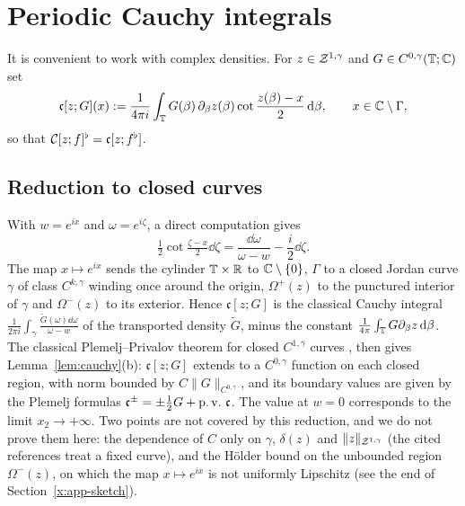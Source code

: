 \section{Periodic Cauchy integrals}\label{app:cauchy}

It is convenient to work with complex densities. For $z\in\mathcal{Z}^{1,\gamma}$ and $G\in C^{0,\gamma}(\mathbb{T};\mathbb{C})$ set
\[
\mathfrak c[z;G](x):=\frac1{4\pi i}\int_{\mathbb{T}} G(\beta)\,\partial_\beta z(\beta)\cot\frac{z(\beta)-x}{2}\,\mathrm{d}\beta,\qquad x\in\mathbb{C}\setminus\Gamma,
\]
so that $\mathcal{C}[z;f]^\flat=\mathfrak c[z;f^\flat]$.

\subsection{Reduction to closed curves}\label{x:app-reduction}
With $w=e^{ix}$ and $\omega=e^{i\zeta}$, a direct computation gives
\[
\tfrac12\cot\tfrac{\zeta-x}{2}\dd\zeta=\frac{\dd\omega}{\omega-w}-\frac i2\dd\zeta .
\]
The map $x\mapsto e^{ix}$ sends the cylinder $\mathbb{T}\times\mathbb{R}$ to $\mathbb{C}\setminus\{0\}$, $\Gamma$ to a closed Jordan curve $\gamma$ of class $C^{k,\gamma}$ winding once around the origin, $\Omega^+(z)$ to the
punctured interior of $\gamma$ and $\Omega^-(z)$ to its exterior. Hence $\mathfrak c[z;G]$ is the classical Cauchy integral $\frac1{2\pi i}\int_\gamma\frac{\tilde G(\omega)\dd\omega}{\omega-w}$ of the
transported density $\tilde G$, minus the constant $\frac1{4\pi}\int_{\mathbb{T}} G\partial_\beta z\,\mathrm{d}\beta$. The classical Plemelj--Privalov theorem for closed $C^{1,\gamma}$ curves
\cite[Chapter~2]{Mus53}, \cite[Chapter~7]{Kre14} then gives Lemma~\ref{lem:cauchy}(b): $\mathfrak c[z;G]$ extends to a $C^{0,\gamma}$ function on each closed region, with norm bounded by
$C\|G\|_{C^{0,\gamma}}$, and its boundary values are given by the Plemelj formulas $\mathfrak c^\pm=\pm\frac12G+\operatorname{p.v.}\,\mathfrak c$. The value at $w=0$ corresponds to the limit $x_2\to+\infty$.
Two points are not covered by this reduction, and we do not prove them here: the dependence of $C$ only on $\gamma$, $\delta(z)$ and $\|z\|_{\mathcal{Z}^{1,\gamma}}$ (the cited references treat a fixed
curve), and the H\"older bound on the unbounded region $\Omega^-(z)$, on which the map $x\mapsto e^{ix}$ is not uniformly Lipschitz (see the end of Section~\ref{x:app-sketch}).

